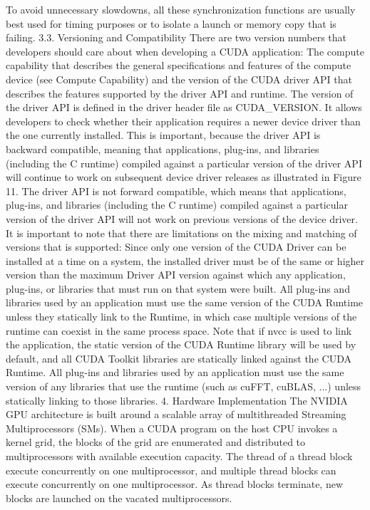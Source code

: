 \documentclass{article}
\begin{document}
To avoid unnecessary slowdowns, all these synchronization functions are usually best used for timing purposes or to isolate a launch or memory copy that is failing.
3.3. Versioning and Compatibility
There are two version numbers that developers should care about when developing a CUDA application: The compute capability that describes the general specifications and features of the compute device (see Compute Capability) and the version of the CUDA driver API that describes the features supported by the driver API and runtime.
The version of the driver API is defined in the driver header file as CUDA\_VERSION. It allows developers to check whether their application requires a newer device driver than the one currently installed. This is important, because the driver API is backward compatible, meaning that applications, plug-ins, and libraries (including the C runtime) compiled against a particular version of the driver API will continue to work on subsequent device driver releases as illustrated in Figure 11. The driver API is not forward compatible, which means that applications, plug-ins, and libraries (including the C runtime) compiled against a particular version of the driver API will not work on previous versions of the device driver.
It is important to note that there are limitations on the mixing and matching of versions that is supported:
Since only one version of the CUDA Driver can be installed at a time on a system, the installed driver must be of the same or higher version than the maximum Driver API version against which any application, plug-ins, or libraries that must run on that system were built.
All plug-ins and libraries used by an application must use the same version of the CUDA Runtime unless they statically link to the Runtime, in which case multiple versions of the runtime can coexist in the same process space. Note that if nvcc is used to link the application, the static version of the CUDA Runtime library will be used by default, and all CUDA Toolkit libraries are statically linked against the CUDA Runtime.
All plug-ins and libraries used by an application must use the same version of any libraries that use the runtime (such as cuFFT, cuBLAS, ...) unless statically linking to those libraries.
4. Hardware Implementation
The NVIDIA GPU architecture is built around a scalable array of multithreaded Streaming Multiprocessors (SMs). When a CUDA program on the host CPU invokes a kernel grid, the blocks of the grid are enumerated and distributed to multiprocessors with available execution capacity. The thread of a thread block execute concurrently on one multiprocessor, and multiple thread blocks can execute concurrently on one multiprocessor. As thread blocks terminate, new blocks are launched on the vacated multiprocessors.
\end{document}
